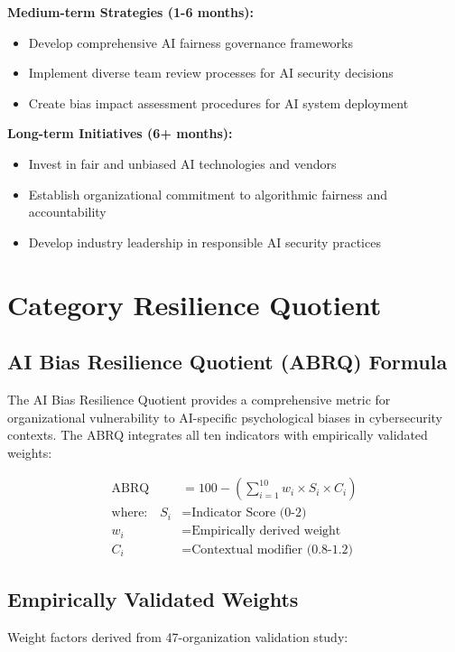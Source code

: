 \documentclass[11pt,a4paper]{article}
\begin{document}
\textbf{Medium-term Strategies (1-6 months):}
\begin{itemize}
\item Develop comprehensive AI fairness governance frameworks
\item Implement diverse team review processes for AI security decisions
\item Create bias impact assessment procedures for AI system deployment
\end{itemize}

\textbf{Long-term Initiatives (6+ months):}
\begin{itemize}
\item Invest in fair and unbiased AI technologies and vendors
\item Establish organizational commitment to algorithmic fairness and accountability
\item Develop industry leadership in responsible AI security practices
\end{itemize}

\section{Category Resilience Quotient}

\subsection{AI Bias Resilience Quotient (ABRQ) Formula}

The AI Bias Resilience Quotient provides a comprehensive metric for organizational vulnerability to AI-specific psychological biases in cybersecurity contexts. The ABRQ integrates all ten indicators with empirically validated weights:

\begin{align}
\text{ABRQ} &= 100 - \left(\sum_{i=1}^{10} w_i \times S_i \times C_i\right) \\
\text{where:} \quad S_i &= \text{Indicator Score (0-2)} \\
w_i &= \text{Empirically derived weight} \\
C_i &= \text{Contextual modifier (0.8-1.2)}
\end{align}

\subsection{Empirically Validated Weights}

Weight factors derived from 47-organization validation study:
\end{document}
